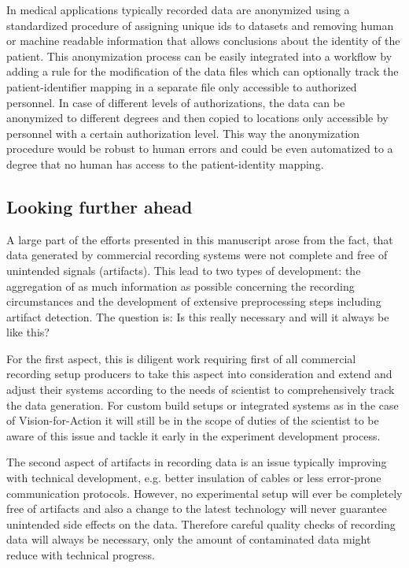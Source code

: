 In medical applications typically recorded data are anonymized using a standardized procedure of assigning unique ids to datasets and removing human or machine readable information that allows conclusions about the identity of the patient. This anonymization process can be easily integrated into a workflow by adding a rule for the modification of the data files which can optionally track the patient-identifier mapping in a separate file only accessible to authorized personnel. In case of different levels of authorizations, the data can be anonymized to different degrees and then copied to locations only accessible by personnel with a certain authorization level. This way the anonymization procedure would be robust to human errors and could be even automatized to a degree that no human has access to the patient-identity mapping.



\subsection{Looking further ahead}
A large part of the efforts presented in this manuscript arose from the fact, that data generated by commercial recording systems were not complete and free of unintended signals (artifacts). This lead to two types of development: the aggregation of as much information as possible concerning the recording circumstances and the development of extensive preprocessing steps including artifact detection. The question is: Is this really necessary and will it always be like this?

For the first aspect, this is diligent work requiring first of all commercial recording setup producers to take this aspect into consideration and extend and adjust their systems according to the needs of scientist to comprehensively track the data generation. For custom build setups or integrated systems as in the case of Vision-for-Action it will still be in the scope of duties of the scientist to be aware of this issue and tackle it early in the experiment development process.

The second aspect of artifacts in recording data is an issue typically improving with technical development, e.g. better insulation of cables or less error-prone communication protocols. However, no experimental setup will ever be completely free of artifacts and also a change to the latest technology will never guarantee unintended side effects on the data. Therefore careful quality checks of recording data will always be necessary, only the amount of contaminated data might reduce with technical progress.

